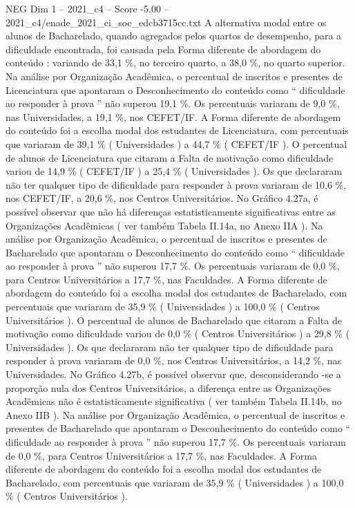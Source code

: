 \begin{textsample}{NEG Dim 1 – 2021\_c4 – Score -5.00 – 2021\_c4/enade\_2021\_ci\_soc\_edcb3715cc.txt}
A alternativa modal entre os alunos de Bacharelado, quando agregados pelos quartos de desempenho, para a dificuldade encontrada, foi causada pela Forma diferente de abordagem do conteúdo : variando de 33,1 \%, no terceiro quarto, a 38,0 \%, no quarto superior.
Na análise por Organização Acadêmica, o percentual de inscritos e presentes de Licenciatura que apontaram o Desconhecimento do conteúdo como “ dificuldade ao responder à prova ” não superou 19,1 \%.
Os percentuais variaram de 9,0 \%, nas Universidades, a 19,1 \%, nos CEFET/IF.
A Forma diferente de abordagem do conteúdo foi a escolha modal dos estudantes de Licenciatura, com percentuais que variaram de 39,1 \% ( Universidades ) a 44,7 \% ( CEFET/IF ).
O percentual de alunos de Licenciatura que citaram a Falta de motivação como dificuldade variou de 14,9 \% ( CEFET/IF ) a 25,4 \% ( Universidades ).
Os que declararam não ter qualquer tipo de dificuldade para responder à prova variaram de 10,6 \%, nos CEFET/IF, a 20,6 \%, nos Centros Universitários.
No Gráfico 4.27a, é possível observar que não há diferenças estatisticamente significativas entre as Organizações Acadêmicas ( ver também Tabela II.14a, no Anexo IIA ).
Na análise por Organização Acadêmica, o percentual de inscritos e presentes de Bacharelado que apontaram o Desconhecimento do conteúdo como “ dificuldade ao responder à prova ” não superou 17,7 \%.
Os percentuais variaram de 0,0 \%, para Centros Universitários a 17,7 \%, nas Faculdades.
A Forma diferente de abordagem do conteúdo foi a escolha modal dos estudantes de Bacharelado, com percentuais que variaram de 35,9 \% ( Universidades ) a 100,0 \% ( Centros Universitários ).
O percentual de alunos de Bacharelado que citaram a Falta de motivação como dificuldade variou de 0,0 \% ( Centros Universitários ) a 29,8 \% ( Universidades ).
Os que declararam não ter qualquer tipo de dificuldade para responder à prova variaram de 0,0 \%, nos Centros Universitários, a 14,2 \%, nas Universidades.
No Gráfico 4.27b, é possível observar que, desconsiderando -se a proporção nula dos Centros Universitários, a diferença entre as Organizações Acadêmicas não é estatisticamente significativa ( ver também Tabela II.14b, no Anexo IIB ).
Na análise por Organização Acadêmica, o percentual de inscritos e presentes de Bacharelado que apontaram o Desconhecimento do conteúdo como “ dificuldade ao responder à prova ” não superou 17,7 \%.
Os percentuais variaram de 0,0 \%, para Centros Universitários a 17,7 \%, nas Faculdades.
A Forma diferente de abordagem do conteúdo foi a escolha modal dos estudantes de Bacharelado, com percentuais que variaram de 35,9 \% ( Universidades ) a 100,0 \% ( Centros Universitários ).

\end{textsample}

